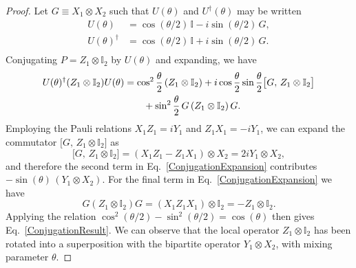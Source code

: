 \documentclass[12pt,a4paper]{article}
\begin{document}
\begin{proof}
Let $G \equiv X_1\otimes X_2$ such that $U(\theta)$ and $U^{\dagger}(\theta)$ may be written
%
\begin{equation}\label{Rewriting}
\begin{split}
    U(\theta) &= \cos(\theta/2)\,\mathbb{I} - i\sin(\theta/2)\,G,\\
    U(\theta)^\dagger &= \cos(\theta/2)\,\mathbb{I} + i\sin(\theta/2)\,G.\\
\end{split}
\end{equation}
%
Conjugating $P = Z_1\otimes\mathbb{I}_2$ by $U(\theta)$ and expanding, we have
%
\begin{align}\label{ConjugationExpansion}
U(\theta)^\dagger(Z_1\otimes\mathbb{I}_2)U(\theta) &= \cos^2\frac{\theta}{2}\,(Z_1\otimes\mathbb{I}_2) + i\cos\frac{\theta}{2}\sin\frac{\theta}{2}\bigl[G,\,Z_1\otimes\mathbb{I}_2\bigr] \notag\\
&\quad \quad + \sin^2\frac{\theta}{2}\,G\,(Z_1\otimes\mathbb{I}_2)\,G.
\end{align}
%
Employing the Pauli relations $X_1 Z_1 = iY_1$ and $Z_1 X_1 = -iY_1$, we can expand the commutator $\bigl[G,\,Z_1\otimes\mathbb{I}_2\bigr]$ as
%
\begin{equation}
\bigl[G,\,Z_1\otimes\mathbb{I}_2\bigr] = (X_1 Z_1 - Z_1 X_1)\otimes X_2 = 2iY_1\otimes X_2,
\end{equation}
%
and therefore the second term in Eq.\ \eqref{ConjugationExpansion} contributes
$-\sin(\theta)\,(Y_1\otimes X_2)$. For the final term in Eq.\ \eqref{ConjugationExpansion} we have
%
\begin{equation}
    G(Z_1\otimes\mathbb{I}_2)G = (X_1 Z_1 X_1)\otimes\mathbb{I}_2 = -Z_1\otimes\mathbb{I}_2.
\end{equation}
%
Applying the relation $\cos^2(\theta/2) - \sin^2(\theta/2) = \cos(\theta)$ then gives Eq.\ \eqref{ConjugationResult}. We can observe that the local operator $Z_1\otimes\mathbb{I}_2$ has been rotated into a superposition with the bipartite operator $Y_1\otimes X_2$, with mixing parameter $\theta$.


\end{proof}
\end{document}
